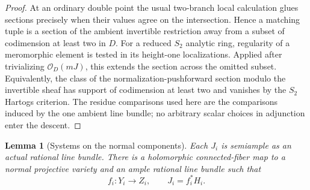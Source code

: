 \documentclass[11pt,letterpaper]{article}
\newtheorem{lemma}[theorem]{Lemma}
\theoremstyle{definition}
\theoremstyle{remark}
\begin{document}
\begin{proof}
At an ordinary double point the usual two-branch local calculation
glues sections precisely when their values agree on the intersection.
Hence a matching tuple is a section of the ambient invertible
restriction away from a subset of codimension at least two in $D$.
For a reduced $S_2$ analytic ring, regularity of a meromorphic element
is tested in its height-one localizations.  Applied after trivializing
$\mathcal{O}_D(mJ)$, this extends the section across the omitted subset.
Equivalently, the class of the normalization-pushforward section
modulo the invertible sheaf has support of codimension at least two
and vanishes by the $S_2$ Hartogs criterion.  The residue comparisons
used here are the comparisons induced by the one ambient line bundle;
no arbitrary scalar choices in adjunction enter the descent.
\end{proof}

\begin{lemma}[Systems on the normal components]
\label{floor:component-systems}
Each $J_i$ is semiample as an actual rational line bundle.  There is a
holomorphic connected-fiber map to a normal projective variety and an
ample rational line bundle such that
\begin{equation}
 \label{floor:stein-system}
 f_i:Y_i\longrightarrow Z_i,\qquad J_i=f_i^*H_i.
\end{equation}
\end{lemma}
\end{document}
